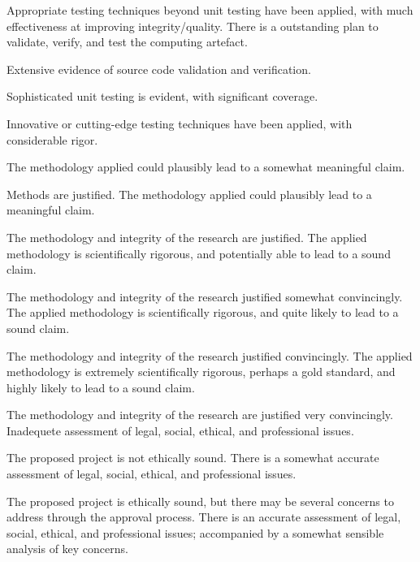 \begin{markingrubric}
            \par Appropriate testing techniques beyond unit testing have been applied, with much effectiveness at improving integrity/quality.
        \grade There is a outstanding plan to validate, verify, and test the computing artefact. 
            \par Extensive evidence of source code validation and verification.
            \par Sophisticated unit testing is evident, with significant coverage.
            \par Innovative or cutting-edge testing techniques have been applied, with considerable rigor.
%
\end{markingrubric}

\begin{markingrubric}
        \grade\fail 
        \grade 		The methodology applied could plausibly lead to a somewhat meaningful claim.
        \par		Methods are justified.
        \grade 		The methodology applied could plausibly lead to a meaningful claim.
        \par		The methodology and integrity of the research are justified.
        \grade 		The applied methodology is scientifically rigorous, and potentially able to lead to a sound claim.
        \par		The methodology and integrity of the research justified somewhat convincingly.
        \grade 		The applied methodology is scientifically rigorous, and quite likely to lead to a sound claim.
        \par		The methodology and integrity of the research justified convincingly.
        \grade 		The applied methodology is extremely scientifically rigorous, perhaps a gold standard, and highly likely to lead to a sound claim.
        \par		The methodology and integrity of the research are justified very convincingly.
%
%
        \grade\fail 	Inadequete assessment of legal, social, ethical, and professional issues.
         \par		The proposed project is not ethically sound.
        \grade 		There is a somewhat accurate assessment of legal, social, ethical, and professional issues.
        \par		The proposed project is ethically sound, but there may be several concerns to address through the approval process.
        \grade 		There is an accurate assessment of legal, social, ethical, and professional issues; accompanied by a somewhat sensible analysis of key concerns.

\end{markingrubric}
